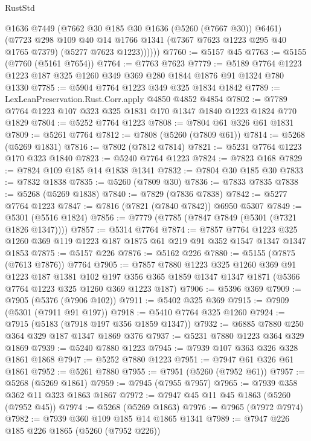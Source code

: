 \begin{lexlean}{RustStd}
\begin{coremodule}
            @1636
            @7449
            (@7662 @30 @185 @30 @1636 (@5260 (@7667 @30)) @6461)
            (@7723
              @298
              @109
              @40
              @14
              @1766
              @1341
              (@7367 @7623 @1223 @295 @40 @1765 @7379)
              (@5277 @7623 @1223))))))
@7760 := @5157 @45
@7763 := @5155 (@7760 (@5161 @7654))
@7764 := @7763 @7623
@7779 := @5189 @7764 @1223 @1223 @187 @325 @1260 @349 @369 @280 @1844 @1876 @91 @1324 @780 @1330
@7785 := @5904 @7764 @1223 @349 @325 @1834 @1842
@7789 := LexLeanPreservation.Rust.Corr.apply @4850 @4852 @4854
@7802 := @7789 @7764 @1223 @107 @323 @325 @1831 @170 @1347 @1840 @1223 @1824 @770 @1829
@7804 := @5252 @7764 @1223
@7808 := @7804 @61 @326 @61 @1831
@7809 := @5261 @7764
@7812 := @7808 (@5260 (@7809 @61))
@7814 := @5268 (@5269 @1831)
@7816 := @7802 (@7812 @7814)
@7821 := @5231 @7764 @1223 @170 @323 @1840
@7823 := @5240 @7764 @1223
@7824 := @7823 @168
@7829 := @7824 @109 @185 @14 @1838 @1341
@7832 := @7804 @30 @185 @30
@7833 := @7832 @1838
@7835 := @5260 (@7809 @30)
@7836 := @7833 @7835
@7838 := @5268 (@5269 @1838)
@7840 := @7829 (@7836 @7838)
@7842 := @5277 @7764 @1223
@7847 := @7816 (@7821 (@7840 @7842)) @6950 @5307
@7849 := @5301 (@5516 @1824)
@7856 := @7779 (@7785 (@7847 @7849 (@5301 (@7321 @1826 @1347))))
@7857 := @5314 @7764
@7874 := @7857
    @7764
    @1223
    @325
    @1260
    @369
    @119
    @1223
    @187
    @1875
    @61
    @219
    @91
    @352
    @1547
    @1347
    @1347
    @1853
@7875 := @5157 @226
@7876 := @5162 @226
@7880 := @5155 (@7875 (@7613 @7876)) @7764
@7905 := @7857
    @7880
    @1223
    @325
    @1260
    @369
    @91
    @1223
    @187
    @1381
    @102
    @197
    @356
    @365
    @1859
    @1347
    @1347
    @1871
    (@5366 @7764 @1223 @325 @1260 @369 @1223 @187)
@7906 := @5396 @369
@7909 := @7905 (@5376 (@7906 @102))
@7911 := @5402 @325 @369
@7915 := @7909 (@5301 (@7911 @91 @197))
@7918 := @5410 @7764 @325 @1260
@7924 := @7915 (@5183 (@7918 @197 @356 @1859 @1347))
@7932 := @6885 @7880 @250 @364 @329 @187 @1347 @1869 @376
@7937 := @5231 @7880 @1223 @364 @329 @1869
@7939 := @5240 @7880 @1223
@7945 := @7939 @107 @363 @326 @328 @1861 @1868
@7947 := @5252 @7880 @1223
@7951 := @7947 @61 @326 @61 @1861
@7952 := @5261 @7880
@7955 := @7951 (@5260 (@7952 @61))
@7957 := @5268 (@5269 @1861)
@7959 := @7945 (@7955 @7957)
@7965 := @7939 @358 @362 @11 @323 @1863 @1867
@7972 := @7947 @45 @11 @45 @1863 (@5260 (@7952 @45))
@7974 := @5268 (@5269 @1863)
@7976 := @7965 (@7972 @7974)
@7982 := @7939 @360 @109 @185 @14 @1865 @1341
@7989 := @7947 @226 @185 @226 @1865 (@5260 (@7952 @226))

\end{coremodule}
\end{lexlean}
